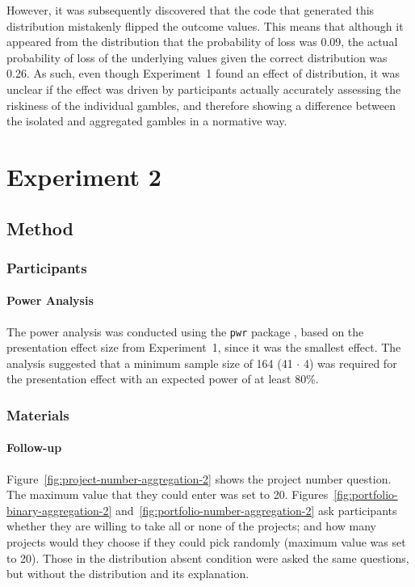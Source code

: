 \documentclass[a4paper, nobind]{templates/ociamthesis}
\theoremstyle{definition}
\theoremstyle{definition}
\theoremstyle{definition}
\theoremstyle{definition}
\theoremstyle{remark}
\begin{document}
However, it was subsequently discovered that the code that generated this
distribution mistakenly flipped the outcome values. This means that although it
appeared from the distribution that the probability of loss was
0.09, the actual probability of loss of the
underlying values given the correct distribution was
0.26. As such, even though Experiment~1
found an effect of distribution, it was unclear if the effect was driven by
participants actually accurately assessing the riskiness of the individual
gambles, and therefore showing a difference between the isolated and aggregated
gambles in a normative way.

\section{Experiment 2}

\subsection{Method}

\subsubsection{Participants}

\hypertarget{power-analysis-aggregation-2}{%
\paragraph{Power Analysis}\label{power-analysis-aggregation-2}}

The power analysis was conducted using the \texttt{pwr} package \autocite{champely2020}, based
on the presentation effect size from Experiment~1, since it was the smallest
effect. The analysis suggested that a minimum sample size of
164 (41 \(\cdot\) 4) was required for
the presentation effect with an expected power of at least 80\%.

\subsubsection{Materials}

\hypertarget{follow-up-materials-aggregation-2-appendix}{%
\paragraph{Follow-up}\label{follow-up-materials-aggregation-2-appendix}}

Figure~\ref{fig:project-number-aggregation-2} shows the project number
question. The maximum value that they could enter was set to 20.
Figures~\ref{fig:portfolio-binary-aggregation-2}
and~\ref{fig:portfolio-number-aggregation-2} ask participants whether they are
willing to take all or none of the projects; and how many projects would they
choose if they could pick randomly (maximum value was set to 20). Those in the
distribution absent condition were asked the same questions, but without the
distribution and its explanation.
\end{document}
